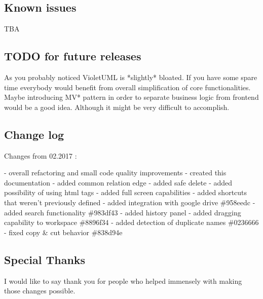 \documentclass{article}
\begin{document}
\subsection{Known issues}

TBA

\subsection{TODO for future releases}
As you probably noticed VioletUML is *slightly* bloated. If you have some spare time
everybody would benefit from overall simplification of core functionalities.
Maybe introducing MV* pattern in order to separate business logic from frontend would be a good idea.
Although it might be very difficult to accomplish.

\subsection{Change log}

Changes from 02.2017 :

- overall refactoring and small code quality improvements \newline
- created this documentation\newline
- added common relation edge\newline
- added safe delete\newline
- added possibility of using html tags\newline
- added full screen capabilities\newline
- added shortcuts that weren't previously defined\newline
- added integration with google drive                        \#958eedc\newline
- added search functionality                                 \#983df43\newline
- added history panel\newline
- added dragging capability to workspace                     \#8896f34\newline
- added detection of duplicate names                         \#0236666\newline
- fixed copy \& cut behavior                                  \#838d94e\newline


\subsection{Special Thanks}
I would like to say thank you for people who helped immensely with making those changes possible.
\end{document}
